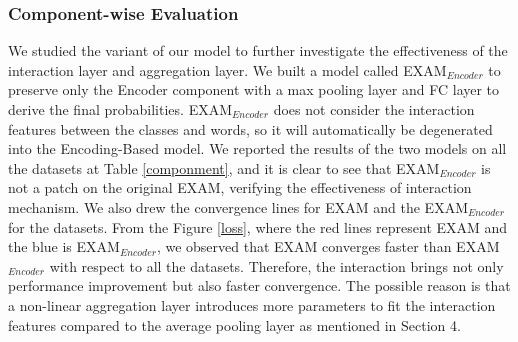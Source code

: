 \documentclass[letterpaper]{article} \usepackage{aaai19}  \usepackage{times}  \usepackage{helvet}  \usepackage{courier}  \usepackage{url}  \usepackage{graphicx}
\begin{document}
\subsubsection{Component-wise Evaluation}
We studied the variant of our model to further investigate the effectiveness of the interaction layer and aggregation layer. We built a model called EXAM$_{Encoder}$ to preserve only the Encoder component with a max pooling layer and FC layer to derive the final probabilities. EXAM$_{Encoder}$ does not consider the interaction features between the classes and words, so it will automatically be degenerated into the Encoding-Based model. We reported the results of the two models on all the datasets at Table \ref{componment}, and it is clear to see that EXAM$_{Encoder}$ is not a patch on the original EXAM, verifying the effectiveness of interaction mechanism.
We also drew the convergence lines for EXAM and the EXAM$_{Encoder}$ for the datasets. From the Figure \ref{loss}, where the red lines represent EXAM and the blue is EXAM$_{Encoder}$, we observed that EXAM converges faster than EXAM$_{Encoder}$ with respect to all the datasets. Therefore, the interaction brings not only performance improvement but also faster convergence. The possible reason is that a non-linear aggregation layer introduces more parameters to fit the interaction features compared to the average pooling layer as mentioned in Section 4.
\end{document}
